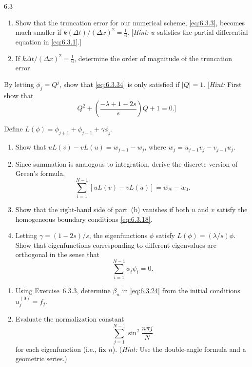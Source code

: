 \begin{exercises}{6.3}
\item
\begin{enumerate}
\item[(a)] Show that the truncation error for our numerical scheme, \eqref{eq:6.3.3}, becomes much smaller if $k(\Delta t)/(\Delta x)^2 = \frac{1}{6}$.  [\emph{Hint:} $u$ satisfies the partial differential equation in \eqref{eq:6.3.1}.]
\item[(b)] If $k\Delta t/(\Delta x)^2 = \frac{1}{6}$, determine the order of magnitude of the truncation error.
\end{enumerate}

\item By letting $\phi_j = Q^j$, show that \eqref{eq:6.3.34} is only satisfied if $|Q| = 1$.  [\emph{Hint:} First show that
\[
Q^2 + \left(\frac{-\lambda + 1 - 2s}{s}\right)Q + 1 = 0.\bigg]
\]

\item Define $L(\phi) = \phi_{j+1} + \phi_{j-1} + \gamma\phi_j$.
\begin{enumerate}
\item[(a)] Show that $uL(v) - vL(u) = w_{j+1} - w_j$, where $w_j = u_{j-1}v_j - v_{j-1}u_j$.
\item[(b)] Since summation is analogous to integration, derive the discrete version of Green's formula,
\[
\sum_{i=1}^{N-1}[uL(v) - vL(u)] = w_N - w_0.
\]
\item[(c)] Show that the right-hand side of part~(b) vanishes if both $u$ and $v$ satisfy the homogeneous boundary conditions \eqref{eq:6.3.18}.
\item[(d)] Letting $\gamma = (1-2s)/s$, the eigenfunctions $\phi$ satisfy $L(\phi) = (\lambda/s)\phi$.  Show that eigenfunctions corresponding to different eigenvalues are orthogonal in the sense that
\[
\sum_{i=1}^{N-1}\phi_i\psi_i = 0.
\]
\end{enumerate}

\item[\starred 6.3.4.]
\begin{enumerate}
\item[(a)] Using Exercise~6.3.3, determine $\beta_n$ in \eqref{eq:6.3.24} from the initial conditions $u_j^{(0)} = f_j$.
\item[(b)] Evaluate the normalization constant
\[
\sum_{j=1}^{N-1}\sin^2\frac{n\pi j}{N}
\]
for each eigenfunction (i.e., fix $n$).  (\emph{Hint:} Use the double-angle formula and a geometric series.)
\end{enumerate}


\end{exercises}
